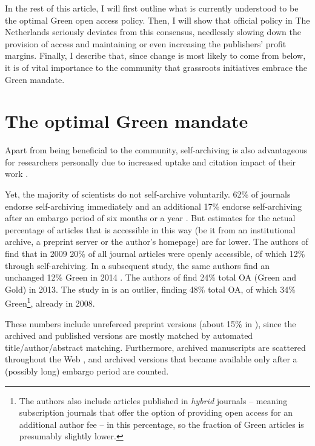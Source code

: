 \documentclass[11pt, openany, oneside, article, a4paper, twocolumn]{memoir}
\begin{document}
In the rest of this article, I will first outline what is currently
understood to be the optimal Green open access policy. Then, I will show
that official policy in The Netherlands seriously deviates from this
consensus, needlessly slowing down the provision of access and maintaining
or even increasing the publishers' profit margins. Finally, I describe
that, since change is most likely to come from below, it is of vital
importance to the community that grassroots initiatives embrace the Green
mandate.

\section{The optimal Green mandate}

Apart from being beneficial to the community, self-archiving is also
advantageous for researchers personally due to increased uptake and
citation impact of their work \cite{gargouri2010self}.

Yet, the majority
of scientists do not self-archive voluntarily. 62\% of journals endorse
self-archiving immediately and an additional 17\% endorse self-archiving
after an embargo period of six months or a year \cite{bjork2014anatomy}.
But estimates for the actual percentage of articles that is accessible in
this way (be it from an institutional archive, a preprint server or the
author's homepage) are far lower. The authors of \cite{bjork2010open} find
that in 2009 20\% of all journal articles were openly accessible, of which
12\% through self-archiving. In a subsequent study, the same authors find
an unchanged 12\% Green in 2014 \cite{bjork2014anatomy}. The authors of
\cite{khabsa2014number} find 24\% total OA (Green and Gold) in 2013. The
study in \cite{archambault2013tipping} is an outlier, finding 48\% total
OA, of which 34\% Green\footnote{The authors also include articles
published in \emph{hybrid} journals -- meaning subscription journals that
offer the option of providing open access for an additional author fee --
in this percentage, so the fraction of Green articles is presumably
slightly lower.}, already in 2008.

These numbers include unrefereed preprint versions (about 15\% in
\cite{bjork2014anatomy}), since the archived and published versions are
mostly matched by automated title/author/abstract matching. Furthermore,
archived manuscripts are scattered throughout the Web
\cite{kim2010faculty}, and archived versions that became available only
after a (possibly long) embargo period are counted.
\end{document}
